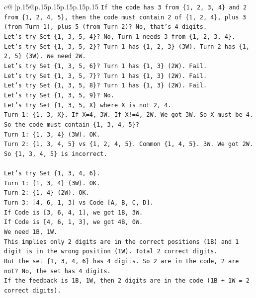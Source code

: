 \documentclass{article}
\begin{document}
{\begin{supertabular}{c@{$\;$}|p{.15\linewidth}@{}p{.15\linewidth}p{.15\linewidth}p{.15\linewidth}p{.15\linewidth}p{.15\linewidth}}
{{{\texttt{If the code has 3 from \{1, 2, 3, 4\} and 2 from \{1, 2, 4, 5\}, then the code must contain 2 of \{1, 2, 4\}, plus 3 (from Turn 1), plus 5 (from Turn 2)? No, that's 4 digits.} \\
\texttt{Let's try Set \{1, 3, 5, 4\}? No, Turn 1 needs 3 from \{1, 2, 3, 4\}.} \\
\texttt{Let's try Set \{1, 3, 5, 2\}? Turn 1 has \{1, 2, 3\} (3W). Turn 2 has \{1, 2, 5\} (3W). We need 2W.} \\
\texttt{Let's try Set \{1, 3, 5, 6\}? Turn 1 has \{1, 3\} (2W). Fail.} \\
\texttt{Let's try Set \{1, 3, 5, 7\}? Turn 1 has \{1, 3\} (2W). Fail.} \\
\texttt{Let's try Set \{1, 3, 5, 8\}? Turn 1 has \{1, 3\} (2W). Fail.} \\
\texttt{Let's try Set \{1, 3, 5, 9\}? No.} \\
\texttt{Let's try Set \{1, 3, 5, X\} where X is not 2, 4.} \\
\texttt{Turn 1: \{1, 3, X\}. If X=4, 3W. If X!=4, 2W. We got 3W. So X must be 4.} \\
\texttt{So the code must contain \{1, 3, 4, 5\}?} \\
\texttt{Turn 1: \{1, 3, 4\} (3W). OK.} \\
\texttt{Turn 2: \{1, 3, 4, 5\} vs \{1, 2, 4, 5\}. Common \{1, 4, 5\}. 3W. We got 2W.} \\
\texttt{So \{1, 3, 4, 5\} is incorrect.} \\
\\ 
\texttt{Let's try Set \{1, 3, 4, 6\}.} \\
\texttt{Turn 1: \{1, 3, 4\} (3W). OK.} \\
\texttt{Turn 2: \{1, 4\} (2W). OK.} \\
\texttt{Turn 3: {[}4, 6, 1, 3{]} vs Code {[}A, B, C, D{]}.} \\
\texttt{If Code is {[}3, 6, 4, 1{]}, we got 1B, 3W.} \\
\texttt{If Code is {[}4, 6, 1, 3{]}, we got 4B, 0W.} \\
\texttt{We need 1B, 1W.} \\
\texttt{This implies only 2 digits are in the correct positions (1B) and 1 digit is in the wrong position (1W). Total 2 correct digits.} \\
\texttt{But the set \{1, 3, 4, 6\} has 4 digits. So 2 are in the code, 2 are not? No, the set has 4 digits.} \\
\texttt{If the feedback is 1B, 1W, then 2 digits are in the code (1B + 1W = 2 correct digits).} \\
}}}
\end{supertabular}}
\end{document}
